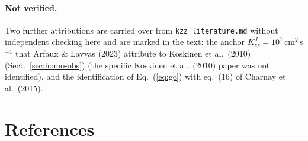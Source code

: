 \documentclass[english,a4paper]{my_memo}
\begin{document}
\paragraph{Not verified.} Two further attributions are carried over from
\texttt{kzz\_literature.md} without independent checking here and are marked
in the text: the anchor $K_{zz}^{J} = 10^{7}$\,cm$^{2}$\,s$^{-1}$ that
Arfaux \& Lavvas (2023) attribute to Koskinen et al.\ (2010)
(Sect.~\ref{sec:homo-obs}) (the specific Koskinen et al.\ (2010) paper
was not identified), and the identification of Eq.~(\ref{eq:gc}) with
eq.~(16) of Charnay et al.\ (2015).

\section{References}
\end{document}
